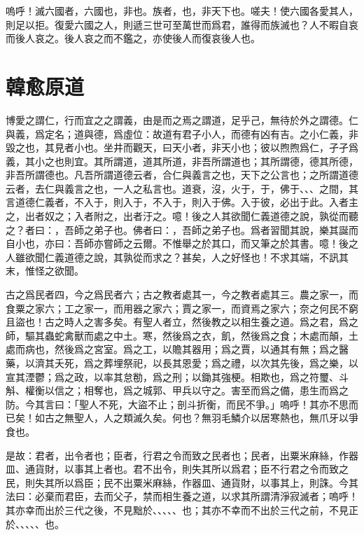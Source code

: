 嗚呼！滅六國者，六國也，非也。族者，也，非天下也。嗟夫！使六國各愛其人，則足以拒。復愛六國之人，則遞三世可至萬世而爲君，誰得而族滅也？人不暇自哀而後人哀之。後人哀之而不鑑之，亦使後人而復哀後人也。

\section[原道\quad{\small 韓愈}]{{\normalsize 韓愈}\quad 原道}
博愛之謂仁，行而宜之之謂義，由是而之焉之謂道，足乎己，無待於外之謂德。仁與義，爲定名；道與德，爲虛位：故道有君子小人，而德有凶有吉。之小仁義，非毀之也，其見者小也。坐井而觀天，曰天小者，非天小也；彼以煦煦爲仁，孑孑爲義，其小之也則宜。其所謂道，道其所道，非吾所謂道也；其所謂德，德其所德，非吾所謂德也。凡吾所謂道德云者，合仁與義言之也，天下之公言也；之所謂道德云者，去仁與義言之也，一人之私言也。道衰，沒，火于，于，佛于、、、之間，其言道德仁義者，不入于，則入于，不入于，則入于佛。入于彼，必出于此。入者主之，出者奴之；入者附之，出者汙之。噫！後之人其欲聞仁義道德之說，孰從而聽之？者曰：，吾師之弟子也。佛者曰：，吾師之弟子也。爲者習聞其說，樂其誕而自小也，亦曰：吾師亦嘗師之云爾。不惟舉之於其口，而又筆之於其書。噫！後之人雖欲聞仁義道德之說，其孰從而求之？甚矣，人之好怪也！不求其端，不訊其末，惟怪之欲聞。

古之爲民者四，今之爲民者六；古之教者處其一，今之教者處其三。農之家一，而食粟之家六；工之家一，而用器之家六；賈之家一，而資焉之家六；奈之何民不窮且盜也！古之時人之害多矣。有聖人者立，然後教之以相生養之道。爲之君，爲之師，驅其蟲蛇禽獸而處之中土。寒，然後爲之衣，飢，然後爲之食；木處而顛，土處而病也，然後爲之宮室。爲之工，以贍其器用；爲之賈，以通其有無；爲之醫藥，以濟其夭死，爲之葬埋祭祀，以長其恩愛；爲之禮，以次其先後，爲之樂，以宣其湮鬱；爲之政，以率其怠勌，爲之刑；以鋤其強梗。相欺也，爲之符璽、斗斛、權衡以信之；相奪也，爲之城郭、甲兵以守之。害至而爲之備，患生而爲之防。今其言曰：「聖人不死，大盜不止；剖斗折衡，而民不爭。」嗚呼！其亦不思而已矣！如古之無聖人，人之類滅久矣。何也？無羽毛鱗介以居寒熱也，無爪牙以爭食也。

是故：君者，出令者也；臣者，行君之令而致之民者也；民者，出粟米麻絲，作器皿、通貨財，以事其上者也。君不出令，則失其所以爲君；臣不行君之令而致之民，則失其所以爲臣；民不出粟米麻絲，作器皿、通貨財，以事其上，則誅。今其法曰：必棄而君臣，去而父子，禁而相生養之道，以求其所謂清淨寂滅者；嗚呼！其亦幸而出於三代之後，不見黜於、、、、、也；其亦不幸而不出於三代之前，不見正於、、、、、也。


